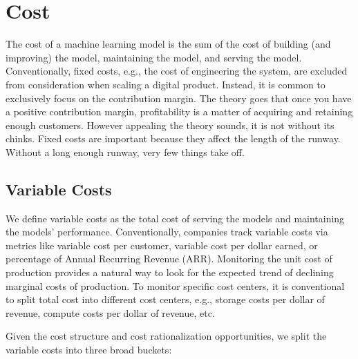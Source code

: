 \documentclass[12pt, letterpaper]{article}
\begin{document}
\section{Cost}
The cost of a machine learning model is the sum of the cost of building (and improving) the model, maintaining the model, and serving the model. Conventionally, fixed costs, e.g., the cost of engineering the system, are excluded from consideration when scaling a digital product. Instead, it is common to exclusively focus on the contribution margin. The theory goes that once you have a positive contribution margin, profitability is a matter of acquiring and retaining enough customers. However appealing the theory sounds, it is not without its chinks. Fixed costs are important because they affect the length of the runway. Without a long enough runway, very few things take off. 

\subsection{Variable Costs}
We define variable costs as the total cost of serving the models and maintaining the models’ performance. Conventionally, companies track variable costs via metrics like variable cost per customer, variable cost per dollar earned, or percentage of Annual Recurring Revenue (ARR). Monitoring the unit cost of production provides a natural way to look for the expected trend of declining marginal costs of production. To monitor specific cost centers, it is conventional to split total cost into different cost centers, e.g., storage costs per dollar of revenue, compute costs per dollar of revenue, etc. 

Given the cost structure and cost rationalization opportunities, we split the variable costs into three broad buckets:
\end{document}
